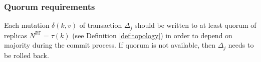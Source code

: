\documentclass[runningheads,a4paper]{llncs}
\newcommand{\transactionj}{$\Delta_{j}$\xspace}
\newcommand{\insertMessage}{$\mathit{M}(c, n, \mathit{upsert(\text{\txState}, k,v)})$\xspace}
\newcommand{\mutation}[2]{$\delta(#1, #2)$\xspace}
\newcommand{\txState}{$\Lambda$\xspace}
\begin{document}
\subsubsection{Quorum requirements}

Each mutation \mutation{k}{v} of transaction \transactionj should be written to at least quorum of replicas $N^{\mathbb{RF}} = \tau(k)$ (see Definition \ref{def:topology}) in order to depend on majority during the commit process. If quorum is not available, then \transactionj needs to be rolled back. 





  
  
\end{document}
